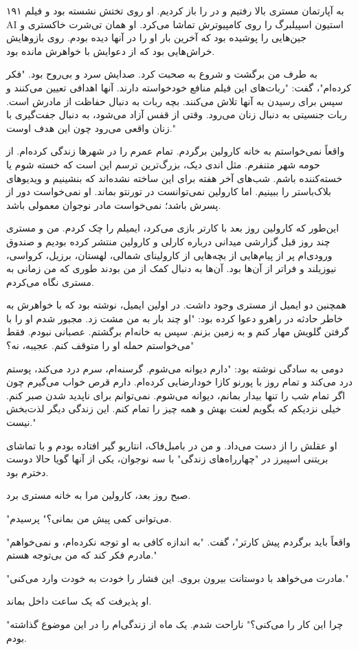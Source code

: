 ۱۹۱  
به آپارتمان مستری بالا رفتیم و در را باز کردیم. او روی تختش نشسته بود و فیلم AI استیون اسپیلبرگ را روی کامپیوترش تماشا می‌کرد. او همان تی‌شرت خاکستری و جین‌هایی را پوشیده بود که آخرین بار او را در آنها دیده بودم. روی بازوهایش خراش‌هایی بود که از دعوایش با خواهرش مانده بود.

به طرف من برگشت و شروع به صحبت کرد. صدایش سرد و بی‌روح بود. "فکر کرده‌ام"، گفت: "ربات‌های این فیلم منافع خودخواسته دارند. آنها اهدافی تعیین می‌کنند و سپس برای رسیدن به آنها تلاش می‌کنند. بچه ربات به دنبال حفاظت از مادرش است. ربات جنسیتی به دنبال زنان می‌رود. وقتی از قفس آزاد می‌شود، به دنبال جفت‌گیری با زنان واقعی می‌رود چون این هدف اوست."

واقعاً نمی‌خواستم به خانه کارولین برگردم. تمام عمرم را در شهرها زندگی کرده‌ام. از حومه شهر متنفرم. مثل اندی دیک، بزرگ‌ترین ترسم این است که خسته شوم یا خسته‌کننده باشم. شب‌های آخر هفته برای این ساخته نشده‌اند که بنشینیم و ویدیوهای بلاک‌باستر را ببینیم. اما کارولین نمی‌توانست در تورنتو بماند. او نمی‌خواست دور از پسرش باشد؛ نمی‌خواست مادر نوجوان معمولی باشد.

این‌طور که کارولین روز بعد با کارتر بازی می‌کرد، ایمیلم را چک کردم. من و مستری چند روز قبل گزارشی ميدانی درباره کارلی و کارولین منتشر کرده بودیم و صندوق ورودی‌ام پر از پیام‌هایی از بچه‌هایی از کارولینای شمالی، لهستان، برزیل، کرواسی، نیوزیلند و فراتر از آن‌ها بود. آن‌ها به دنبال کمک از من بودند طوری که من زمانی به مستری نگاه می‌کردم.

همچنین دو ایمیل از مستری وجود داشت. در اولین ایمیل، نوشته بود که با خواهرش به خاطر حادثه در راهرو دعوا کرده بود: "او چند بار به من مشت زد. مجبور شدم او را با گرفتن گلویش مهار کنم و به زمین بزنم. سپس به خانه‌ام برگشتم. عصبانی نبودم. فقط می‌خواستم حمله او را متوقف کنم. عجیبه، نه؟"

دومی به سادگی نوشته بود: "دارم دیوانه می‌شوم. گرسنه‌ام، سرم درد می‌کند، پوستم درد می‌کند و تمام روز با پورنو کازا خودارضایی کرده‌ام. دارم قرص خواب می‌گیرم چون اگر تمام شب را تنها بیدار بمانم، دیوانه می‌شوم. نمی‌توانم برای ناپدید شدن صبر کنم. خیلی نزدیکم که بگویم لعنت بهش و همه چیز را تمام کنم. این زندگی دیگر لذت‌بخش نیست."

او عقلش را از دست می‌داد. و من در بامبل‌فاک، انتاریو گیر افتاده بودم و با تماشای بریتنی اسپیرز در "چهارراه‌های زندگی" با سه نوجوان، یکی از آنها گویا حالا دوست دخترم بود.

صبح روز بعد، کارولین مرا به خانه مستری برد.  

"می‌توانی کمی پیش من بمانی؟" پرسیدم.

"واقعاً باید برگردم پیش کارتر"، گفت. "به اندازه کافی به او توجه نکرده‌ام، و نمی‌خواهم مادرم فکر کند که من بی‌توجه هستم."

"مادرت می‌خواهد با دوستانت بیرون بروی. این فشار را خودت به خودت وارد می‌کنی."

او پذیرفت که یک ساعت داخل بماند.  

"چرا این کار را می‌کنی؟" ناراحت شدم. یک ماه از زندگی‌ام را در این موضوع گذاشته بودم.